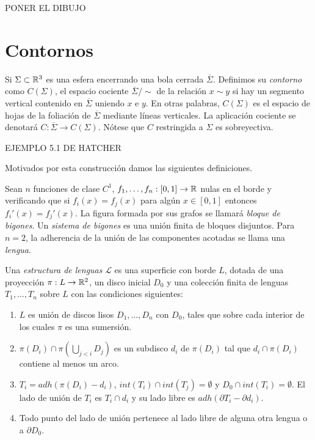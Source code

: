 \documentclass[twoside, 11pt]{article}
\begin{document}
PONER EL DIBUJO 

\section{Contornos}

 Si $\Sigma\subset\mathbb{R}^3$ es una esfera encerrando una bola cerrada $\overline{\Sigma}$. Definimos su \emph{contorno} como $C(\Sigma)$, el espacio cociente $\overline{\Sigma}/\sim$ de la relación $x\sim y$ si hay un segmento vertical contenido en $\overline{\Sigma}$ uniendo $x$ e $y$. En otras palabras, $C(\Sigma)$ es el espacio de hojas de la foliación de $\overline{\Sigma}$ mediante líneas verticales. La aplicación cociente se denotará $C:\overline{\Sigma}\to C(\Sigma)$. Nótese que $C$ restringida a $\Sigma$ es sobreyectiva. 
 
 EJEMPLO 5.1 DE HATCHER
 
 Motivados por esta construcción damos las siguientes definiciones.
 
 \begin{defi}
 Sean $n$ funciones de clase $C^1$, $f_1,\dots, f_n:[0,1]\to\mathbb{R}$ nulas en el borde y verificando que si $f_i(x)=f_j(x)$ para algún $x\in [0,1]$ entonces $f_i'(x)=f_j'(x)$. La figura formada por sus grafos se llamará \emph{bloque de bigones}. Un \emph{sistema de bigones} es una unión finita de bloques disjuntos. Para $n=2$, la adherencia de la unión de las componentes acotadas se llama una \emph{lengua}. 
 \end{defi}

\begin{defi}\label{lenguas}
Una \emph{estructura de lenguas} $\mathcal{L}$ es una superficie con borde $L$, dotada de una proyección $\pi:L\to\mathbb{R}^2$, un disco inicial $D_0$ y una colección finita de lenguas $T_1,\dots, T_n$ sobre $L$ con las condiciones siguientes:
\begin{enumerate}
\item $L$ es unión de discos lisos $D_1,\dots, D_n$ con $D_0$, tales que sobre cada interior de los cuales $\pi$ es una sumersión. 
\item $\pi(D_i)\cap\pi\left(\bigcup_{j<i}D_j\right)$ es un subdisco $d_i$ de $\pi(D_i)$ tal que $d_i\cap\pi(D_i)$ contiene al menos un arco. 
\item $T_i=adh(\pi(D_i)-d_i)$, $int(T_i)\cap int(T_j)=\emptyset$ y $D_0\cap int(T_i)=\emptyset$. El lado de unión de $T_i$ es $T_i\cap d_i$ y su lado libre es $adh(\partial T_i-\partial d_i)$. 
\item Todo punto del lado de unión pertenece al lado libre de alguna otra lengua o a $\partial D_0$.  
\end{enumerate}
\end{defi}
\end{document}
